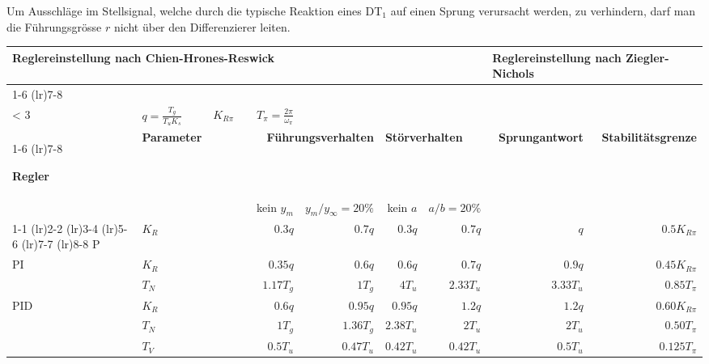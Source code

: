 Um Ausschläge im Stellsignal, welche durch die typische Reaktion eines DT\(_1\) auf einen Sprung verursacht werden, zu verhindern, darf man die Führungsgrösse \(r\) nicht über den Differenzierer leiten.

\begin{table}
	\renewcommand\arraystretch{1.2}
	\begin{tabular}{ ll rrrrrr }
		\toprule
		\multicolumn{6}{l}{
			\textbf{Reglereinstellung nach Chien-Hrones-Reswick}
		}
		&
		\multicolumn{2}{l}{
			\textbf{Reglereinstellung nach Ziegler-Nichols}
		}
		\\ 

		\cmidrule(lr){1-6} \cmidrule(lr){7-8}
		\multicolumn{6}{l}{
			\(\displaystyle
				q = \frac{T_g}{T_uK_S} \qquad \mu = \frac{T_g}{T_u}
				\qquad \text{wenn} \quad \mu
				\begin{cases}
					> 10 \rightarrow \text{Strecke gut regelbar} \\
					< 3 \rightarrow \text{Strecke schlecht regelbar}
				\end{cases}
			\)
		}
		&
		\( q = \frac{T_g}{T_uK_s} \)
		&
		\(K_{R\pi} \qquad T_\pi=\frac{2\pi}{\omega_\pi}\)
		\\

		\cmidrule(lr){1-6} \cmidrule(lr){7-8}

		\textbf{Regler} & \textbf{Parameter} &
		\multicolumn{2}{p{3.5cm}}{
			\textbf{Führungsverhalten} %
		}
		&
		\multicolumn{2}{l}{
			\textbf{Störverhalten}
		}
		&
		\textbf{Sprungantwort}
		&
		\textbf{Stabilitätsgrenze}
		\\

		& & kein $y_m$ & $y_m / y_\infty = 20 \%$ & kein $a$ & $a / b = 20 \%$ & & \\

		\cmidrule(lr){1-1}
		\cmidrule(lr){2-2}
		\cmidrule(lr){3-4}
		\cmidrule(lr){5-6}
		\cmidrule(lr){7-7}
		\cmidrule(lr){8-8}
		P & $K_R$ & $0.3q$ & $0.7q$ & $0.3q$ & $0.7q$ & $q$ & $0.5K_{R\pi}$ \\

		PI & $K_R$ & $0.35q$   & $0.6q$ & $0.6q$ & $0.7q$    & $0.9q$    & $0.45K_{R\pi}$ \\
       & $T_N$ & $1.17T_g$ & $1T_g$ & $4T_u$ & $2.33T_u$ & $3.33T_u$ & $0.85T_{\pi}$  \\

		PID & $K_R$ & $0.6q$   & $0.95q$   & $0.95q$   & $1.2q$    & $1.2q$   & $0.60K_{R\pi}$ \\
        & $T_N$ & $1T_g$   & $1.36T_g$ & $2.38T_u$ & $2T_u$    & $2T_u$   & $0.50T_\pi$    \\
        & $T_V$ & $0.5T_u$ & $0.47T_u$ & $0.42T_u$ & $0.42T_u$ & $0.5T_u$ & $0.125T_\pi$   \\
		\bottomrule
	\end{tabular}
\end{table}

